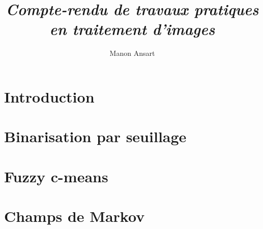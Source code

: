 \documentclass[a4paper, 12pt, french, titlepage]{report}
\title{\textit{Compte-rendu de travaux pratiques en traitement d'images}}
\author{Manon Ansart}
\date{}
\begin{document}

	\maketitle

    \chapter*{Introduction}
        
    
    \chapter{Binarisation par seuillage}
        

    \chapter{Fuzzy c-means}
        

    \chapter{Champs de Markov}
        
\end{document}
